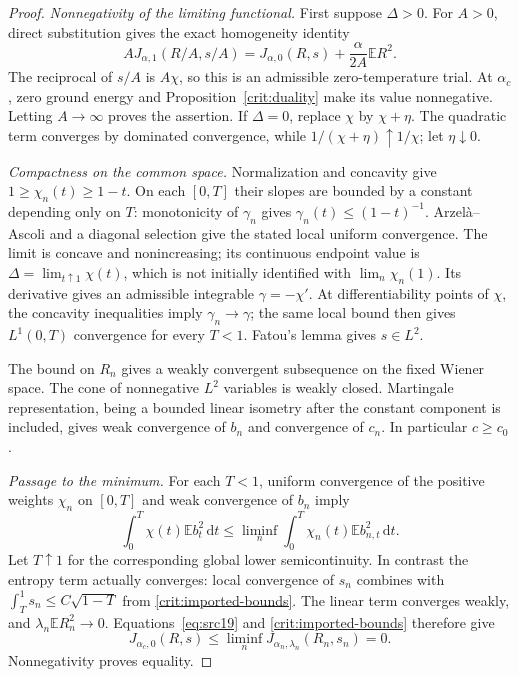 \documentclass[11pt,a4paper]{article}
\numberwithin{equation}{section}
\theoremstyle{definition}
\theoremstyle{remark}
\newcommand{\E}{\mathbb E}
\newcommand{\dd}{\mathrm d}
\begin{document}
\begin{proof}
\emph{Nonnegativity of the limiting functional.}
First suppose $\Delta>0$.  For $A>0$, direct substitution gives the exact
homogeneity identity
\begin{equation}\label{crit:homogeneity}
 A J_{\alpha,1}(R/A,s/A)
      =J_{\alpha,0}(R,s)+\frac{\alpha}{2A}\E R^2.
\end{equation}
The reciprocal of $s/A$ is $A\chi$, so this is an admissible
zero-temperature trial.  At $\alpha_c$, zero ground energy and
Proposition~\ref{crit:duality} make its value nonnegative.  Letting
$A\to\infty$ proves the assertion.  If $\Delta=0$, replace $\chi$ by
$\chi+\eta$.  The quadratic term converges by dominated convergence,
while $1/(\chi+\eta)\uparrow1/\chi$; let $\eta\downarrow0$.

\emph{Compactness on the common space.}
Normalization and concavity give
$1\ge\chi_n(t)\ge1-t$.  On each $[0,T]$ their slopes are bounded by a
constant depending only on $T$: monotonicity of $\gamma_n$ gives
$\gamma_n(t)\le(1-t)^{-1}$.  Arzel\`a--Ascoli and a diagonal selection
give the stated local uniform convergence.  The limit is concave and
nonincreasing; its continuous endpoint value is
$\Delta=\lim_{t\uparrow1}\chi(t)$, which is not initially identified with
$\lim_n\chi_n(1)$.  Its derivative gives an admissible integrable
$\gamma=-\chi'$.  At differentiability points of $\chi$, the concavity
inequalities imply $\gamma_n\to\gamma$; the same local bound then gives
$L^1(0,T)$ convergence for every $T<1$.  Fatou's lemma gives $s\in L^2$.

The bound on $R_n$ gives a weakly convergent subsequence on the fixed
Wiener space.  The cone of nonnegative $L^2$ variables is weakly closed.
Martingale representation, being a bounded linear isometry after the
constant component is included, gives weak convergence of $b_n$ and
convergence of $c_n$.  In particular $c\ge c_0$.

\emph{Passage to the minimum.}
For each $T<1$, uniform convergence of the positive weights $\chi_n$ on
$[0,T]$ and weak convergence of $b_n$ imply
\[
 \int_0^T\chi(t)\E b_t^2\,\dd t
   \le\liminf_n\int_0^T\chi_n(t)\E b_{n,t}^2\,\dd t.
\]
Let $T\uparrow1$ for the corresponding global lower semicontinuity.
In contrast the entropy term actually converges: local convergence of
$s_n$ combines with
$\int_T^1s_n\le C\sqrt{1-T}$ from \eqref{crit:imported-bounds}.
The linear term converges weakly, and
$\lambda_n\E R_n^2\to0$.  Equations~\eqref{eq:src19} and
\eqref{crit:imported-bounds} therefore give
\[
 J_{\alpha_c,0}(R,s)
       \le\liminf_nJ_{\alpha_n,\lambda_n}(R_n,s_n)=0.
\]
Nonnegativity proves equality.
\end{proof}
\end{document}

